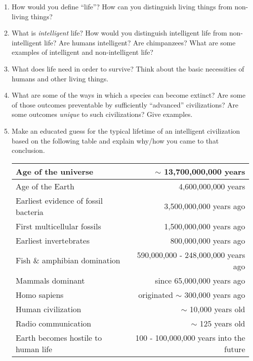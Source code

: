 \documentclass[12pt]{article}
\begin{document}
\begin{enumerate}

\item How would you define ``life''?  
How can you distinguish living things from non-living things?

\item  What is \textit{intelligent} life?  
How would you distinguish intelligent life from non-intelligent life?  
Are humans intelligent?  Are chimpanzees?  What are some examples of intelligent and non-intelligent life? %

\item  What does life need in order to survive?  
Think about the basic necessities of humans and other living things.

\item What are some of the ways in which a species can become extinct?  %
Are some of those outcomes preventable by sufficiently ``advanced'' civilizations?  Are some outcomes \textit{unique} to such civilizations?  Give examples.

\item Make an educated guess for the typical lifetime of an intelligent civilization based on the following table and explain why/how you came to that conclusion.

\begin{center}
\setlength{\tabcolsep}{10pt}
\begin{tabular}{|p{7.5cm}|r|}
\hline
    Age of the universe & $\sim$ 13,700,000,000 years \\ \hline
    Age of the Earth & 4,600,000,000 years \\ \hline
    Earliest %
    evidence of fossil bacteria & 3,500,000,000 years ago \\ \hline
    First multicellular fossils & 1,500,000,000 years ago \\ \hline
    Earliest invertebrates & 800,000,000 years ago \\ \hline
    Fish \& amphibian domination & 590,000,000 - 248,000,000 years ago \\ \hline
    Mammals dominant & since 65,000,000 years ago \\ \hline
    Homo sapiens & originated $\sim$ 300,000 years ago \\ \hline
    Human civilization & $\sim$ 10,000 years old \\ \hline
    Radio communication & $\sim$ 125 years old \\ \hline
    Earth becomes hostile to human life%
    & 100 - 100,000,000 years into the future \\ \hline
\end{tabular}
\end{center}

\end{enumerate}
\end{document}
